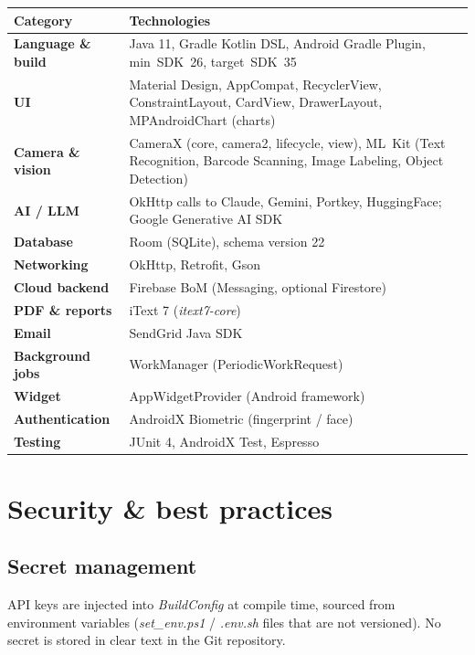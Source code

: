 \documentclass[11pt,a4paper]{article}
\begin{document}
\begin{tabularx}{\linewidth}{@{}lX@{}}
\toprule
\textbf{Category} & \textbf{Technologies}\\
\midrule
\textbf{Language \& build}      & Java 11, Gradle Kotlin DSL, Android Gradle Plugin, min~SDK~26, target~SDK~35 \\
\textbf{UI}                     & Material Design, AppCompat, RecyclerView, ConstraintLayout, CardView, DrawerLayout, MPAndroidChart (charts)\\
\textbf{Camera \& vision}       & CameraX (core, camera2, lifecycle, view), ML~Kit (Text Recognition, Barcode Scanning, Image Labeling, Object Detection)\\
\textbf{AI / LLM}               & OkHttp calls to Claude, Gemini, Portkey, HuggingFace; Google Generative AI SDK\\
\textbf{Database}               & Room (SQLite), schema version 22 \\
\textbf{Networking}             & OkHttp, Retrofit, Gson\\
\textbf{Cloud backend}          & Firebase BoM (Messaging, optional Firestore)\\
\textbf{PDF \& reports}         & iText 7 (\emph{itext7-core}) \\
\textbf{Email}                  & SendGrid Java SDK \\
\textbf{Background jobs}        & WorkManager (PeriodicWorkRequest) \\
\textbf{Widget}                 & AppWidgetProvider (Android framework) \\
\textbf{Authentication}         & AndroidX Biometric (fingerprint / face) \\
\textbf{Testing}                & JUnit 4, AndroidX Test, Espresso \\
\bottomrule
\end{tabularx}

\section{Security \& best practices}

\subsection{Secret management}
API keys are injected into \emph{BuildConfig} at compile time, sourced
from environment variables (\emph{set\_env.ps1} / \emph{.env.sh} files
that are not versioned). No secret is stored in clear text in the Git
repository.
\end{document}

